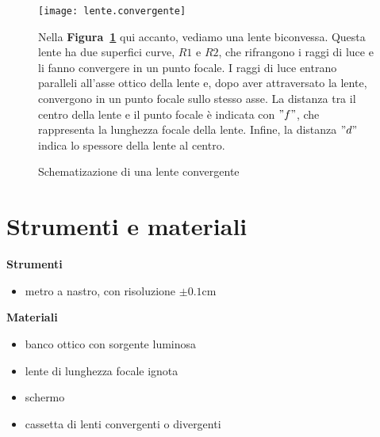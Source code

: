 \documentclass{article}
\begin{document}
\begin{figure}[htbp]
	\begin{minipage}{0.55 \textwidth}
		\centering
		\texttt{[image: lente.convergente]}
		\caption{Schematizazione di una lente convergente}	
		\label{fig:l.c}
	\end{minipage}
\hfill	
	\begin{minipage}{0.40 \textwidth}
		Nella \textbf{Figura~\ref{fig:l.c}} qui accanto, vediamo una lente biconvessa. Questa lente ha due superfici curve, \( R1 \) e \( R2 \), che rifrangono i raggi di luce e li fanno convergere in un punto focale. I raggi di luce entrano paralleli all'asse ottico della lente e, dopo aver attraversato la lente, convergono in un punto focale sullo stesso asse. La distanza tra il centro della lente e il punto focale è indicata con \( "f" \), che rappresenta la lunghezza focale della lente. Infine, la distanza \( "d" \) indica lo spessore della lente al centro.

	\end{minipage}
\end{figure}

\section{Strumenti e materiali}

\textbf{Strumenti}

\begin{itemize}
    \item metro a nastro, con risoluzione $\pm 0.1 \si{\centi\meter}$
\end{itemize}

\textbf{Materiali}

\begin{itemize}
    \item banco ottico con sorgente luminosa
    \item lente di lunghezza focale ignota
    \item schermo
    \item cassetta di lenti convergenti o divergenti
\end{itemize}
\end{document}

